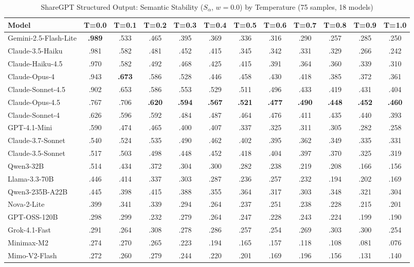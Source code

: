 \documentclass{article}
\theoremstyle{plain}
\theoremstyle{definition}
\begin{document}
\begin{table}[t]
\centering
\caption{ShareGPT Structured Output: Semantic Stability ($S_\alpha$, $w{=}0.0$) by Temperature (75 samples, 18 models)}
\label{tab:sharegpt-semantic-temp}
\scriptsize
\begin{tabular}{@{}lccccccccccc@{}}
\toprule
\textbf{Model} & \textbf{T=0.0} & \textbf{T=0.1} & \textbf{T=0.2} & \textbf{T=0.3} & \textbf{T=0.4} & \textbf{T=0.5} & \textbf{T=0.6} & \textbf{T=0.7} & \textbf{T=0.8} & \textbf{T=0.9} & \textbf{T=1.0} \\
\midrule
Gemini-2.5-Flash-Lite & \textbf{.989} & .533 & .465 & .395 & .369 & .336 & .316 & .290 & .257 & .285 & .250 \\
Claude-3.5-Haiku & .981 & .582 & .481 & .452 & .415 & .345 & .342 & .331 & .329 & .266 & .242 \\
Claude-Haiku-4.5 & .970 & .582 & .492 & .468 & .425 & .415 & .391 & .364 & .360 & .339 & .310 \\
Claude-Opus-4 & .943 & \textbf{.673} & .586 & .528 & .446 & .458 & .430 & .418 & .385 & .372 & .361 \\
Claude-Sonnet-4.5 & .902 & .653 & .586 & .553 & .529 & .511 & .496 & .433 & .419 & .431 & .404 \\
Claude-Opus-4.5 & .767 & .706 & \textbf{.620} & \textbf{.594} & \textbf{.567} & \textbf{.521} & \textbf{.477} & \textbf{.490} & \textbf{.448} & \textbf{.452} & \textbf{.460} \\
Claude-Sonnet-4 & .626 & .596 & .592 & .484 & .487 & .464 & .476 & .411 & .435 & .440 & .393 \\
GPT-4.1-Mini & .590 & .474 & .465 & .400 & .407 & .337 & .325 & .311 & .305 & .282 & .258 \\
Claude-3.7-Sonnet & .540 & .524 & .535 & .490 & .462 & .402 & .395 & .362 & .349 & .335 & .331 \\
Claude-3.5-Sonnet & .517 & .503 & .498 & .448 & .452 & .418 & .404 & .397 & .370 & .325 & .319 \\
Qwen3-32B & .514 & .434 & .372 & .304 & .300 & .282 & .238 & .219 & .208 & .166 & .156 \\
Llama-3.3-70B & .446 & .414 & .337 & .303 & .287 & .236 & .257 & .232 & .194 & .202 & .169 \\
Qwen3-235B-A22B & .445 & .398 & .415 & .388 & .355 & .364 & .317 & .303 & .348 & .321 & .304 \\
Nova-2-Lite & .399 & .341 & .339 & .294 & .264 & .237 & .251 & .238 & .228 & .215 & .201 \\
GPT-OSS-120B & .298 & .299 & .232 & .279 & .264 & .247 & .228 & .243 & .224 & .199 & .190 \\
Grok-4.1-Fast & .291 & .264 & .308 & .278 & .286 & .257 & .254 & .269 & .303 & .300 & .254 \\
Minimax-M2 & .274 & .270 & .265 & .223 & .194 & .165 & .157 & .118 & .108 & .081 & .076 \\
Mimo-V2-Flash & .272 & .260 & .279 & .244 & .220 & .201 & .169 & .196 & .156 & .131 & .140 \\
\bottomrule
\end{tabular}


\end{table}
\end{document}

